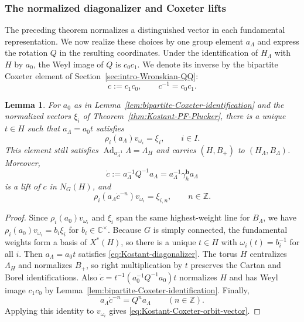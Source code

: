 \documentclass[11pt,leqno]{amsart}
\numberwithin{equation}{section}
\theoremstyle{plain}
\newtheorem{lemma}[theorem]{Lemma}
\theoremstyle{definition}
\theoremstyle{plain}
\theoremstyle{definition}
\theoremstyle{remark}
\begin{document}
\subsubsection{The normalized diagonalizer and Coxeter lifts}
The preceding theorem normalizes a distinguished vector in each fundamental representation.  We now realize these choices by one group element $a_\Lambda$ and express the rotation $Q$ in the resulting coordinates.  Under the identification of $H_\Lambda$ with $H$ by $a_0$, the Weyl image of $Q$ is $c_0c_1$.  We denote its inverse by the bipartite Coxeter element of Section~\ref{sec:intro-Wronskian-QQ}:
\begin{equation}\label{eq:fixed-datum-bipartite-Coxeter}
 c:=c_1c_0,
 \qquad c^{-1}=c_0c_1.
\end{equation}
\begin{lemma}\label{lem:Kostant-full-transport}
For $a_0$ as in Lemma~\ref{lem:bipartite-Coxeter-identification} and the normalized vectors $\xi_i$ of Theorem~\ref{thm:Kostant-PF-Plucker}, there is a unique $t\in H$ such that $a_\Lambda=a_0t$ satisfies
\begin{equation}\label{eq:Kostant-diagonalizer}
 \rho_i(a_\Lambda)v_{\omega_i}=\xi_i,
 \qquad i\in I.
\end{equation}
This element still satisfies $\operatorname{Ad}_{a_\Lambda^{-1}}\Lambda=\Lambda_H$ and carries $(H,B_+)$ to $(H_\Lambda,B_\Lambda)$.  Moreover,
\begin{equation}\label{eq:Kostant-Coxeter-lift}
 \dot c
 :=a_\Lambda^{-1}Q^{-1}a_\Lambda
 =a_\Lambda^{-1}\gamma_h^{\mathbf h}a_\Lambda
\end{equation}
is a lift of $c$ in $N_G(H)$, and
\begin{equation}\label{eq:Kostant-Coxeter-orbit-vector}
 \rho_i(a_\Lambda\dot c^{-n})v_{\omega_i}
 =\xi_{i,n},
 \qquad n\in\mathbb Z.
\end{equation}
\end{lemma}
\begin{proof}
Since $\rho_i(a_0)v_{\omega_i}$ and $\xi_i$ span the same highest-weight line for $B_\Lambda$, we have $\rho_i(a_0)v_{\omega_i}=b_i\xi_i$ for $b_i\in\mathbb C^\times$.  Because $G$ is simply connected, the fundamental weights form a basis of $X^*(H)$, so there is a unique $t\in H$ with $\omega_i(t)=b_i^{-1}$ for all $i$.  Then $a_\Lambda=a_0t$ satisfies \eqref{eq:Kostant-diagonalizer}.  The torus $H$ centralizes $\Lambda_H$ and normalizes $B_+$, so right multiplication by $t$ preserves the Cartan and Borel identifications.  Also $\dot c=t^{-1}(a_0^{-1}Q^{-1}a_0)t$ normalizes $H$ and has Weyl image $c_1c_0$ by Lemma~\ref{lem:bipartite-Coxeter-identification}.  Finally,
\[
 a_\Lambda\dot c^{-n}=Q^na_\Lambda
 \qquad(n\in\mathbb Z).
\]
Applying this identity to $v_{\omega_i}$ gives \eqref{eq:Kostant-Coxeter-orbit-vector}.
\end{proof}
\end{document}
